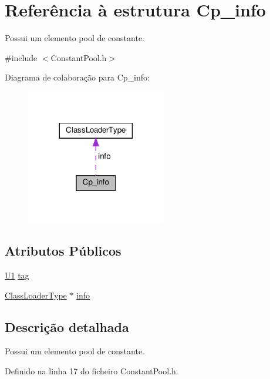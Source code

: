 \hypertarget{structCp__info}{}\section{Referência à estrutura Cp\+\_\+info}
\label{structCp__info}


Possui um elemento pool de constante.  




{\ttfamily \#include $<$Constant\+Pool.\+h$>$}



Diagrama de colaboração para Cp\+\_\+info\+:
\nopagebreak
\begin{figure}[H]
\begin{center}
\leavevmode
\includegraphics[width=173pt]{structCp__info__coll__graph}
\end{center}
\end{figure}
\subsection*{Atributos Públicos}
\begin{DoxyCompactItemize}
\item 
\hyperlink{BasicTypes_8h_a9bffe5bb2564f91cd90fb7d06848f9a8}{U1} \hyperlink{structCp__info_a74ba6be7ad12511cc5df37e43984add0}{tag}
\item 
\hyperlink{unionClassLoaderType}{Class\+Loader\+Type} $\ast$ \hyperlink{structCp__info_ace48d3773256ae8a504dea48352c0b93}{info}
\end{DoxyCompactItemize}


\subsection{Descrição detalhada}
Possui um elemento pool de constante. 

Definido na linha 17 do ficheiro Constant\+Pool.\+h.



